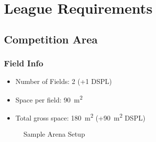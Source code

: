 \chapter{League Requirements}\label{chap:league-requirements}

\section{Competition Area}

\subsection{Field Info}
\begin{itemize}
    \item Number of Fields: 2 (+1 DSPL)
    \item Space per field: \qty{90}{\meter\squared}
    \item Total gross space: \qty{180}{\meter\squared} (+\qty{90}{\meter\squared} DSPL)
\end{itemize}

\begin{figure}[H]
	\centering
	\caption{Sample Arena Setup}
	\label{fig:sample_arena_setup}
\end{figure}

